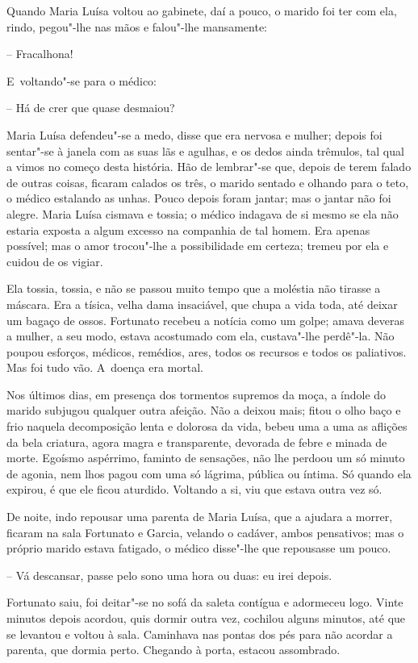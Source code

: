 Quando Maria Luísa voltou ao gabinete, daí a pouco, o marido foi ter com
ela, rindo, pegou"-lhe nas mãos e falou"-lhe mansamente:

-- Fracalhona!

E~voltando"-se para o médico:

-- Há de crer que quase desmaiou?

Maria Luísa defendeu"-se a medo, disse que era nervosa e mulher; depois
foi sentar"-se à janela com as suas lãs e agulhas, e os dedos ainda
trêmulos, tal qual a vimos no começo desta história. Hão de lembrar"-se
que, depois de terem falado de outras coisas, ficaram calados os três, o
marido sentado e olhando para o teto, o médico estalando as unhas. Pouco
depois foram jantar; mas o jantar não foi alegre. Maria Luísa cismava e
tossia; o médico indagava de si mesmo se ela não estaria exposta a algum
excesso na companhia de tal homem. Era apenas possível; mas o amor
trocou"-lhe a possibilidade em certeza; tremeu por ela e cuidou de os
vigiar.

Ela tossia, tossia, e não se passou muito tempo que a moléstia não
tirasse a máscara. Era a tísica, velha dama insaciável, que chupa a vida
toda, até deixar um bagaço de ossos. Fortunato recebeu a notícia como um
golpe; amava deveras a mulher, a seu modo, estava acostumado com ela,
custava"-lhe perdê"-la. Não poupou esforços, médicos, remédios, ares,
todos os recursos e todos os paliativos. Mas foi tudo vão. A~doença era
mortal.

Nos últimos dias, em presença dos tormentos supremos da moça, a índole
do marido subjugou qualquer outra afeição. Não a deixou mais; fitou o
olho baço e frio naquela decomposição lenta e dolorosa da vida, bebeu
uma a uma as aflições da bela criatura, agora magra e transparente,
devorada de febre e minada de morte. Egoísmo aspérrimo, faminto de
sensações, não lhe perdoou um só minuto de agonia, nem lhos pagou com
uma só lágrima, pública ou íntima. Só quando ela expirou, é que ele
ficou aturdido. Voltando a si, viu que estava outra vez só.

De noite, indo repousar uma parenta de Maria Luísa, que a ajudara a
morrer, ficaram na sala Fortunato e Garcia, velando o cadáver, ambos
pensativos; mas o próprio marido estava fatigado, o médico disse"-lhe que
repousasse um pouco.

-- Vá descansar, passe pelo sono uma hora ou duas: eu irei depois.

Fortunato saiu, foi deitar"-se no sofá da saleta contígua e adormeceu
logo. Vinte minutos depois acordou, quis dormir outra vez, cochilou
alguns minutos, até que se levantou e voltou à sala. Caminhava nas
pontas dos pés para não acordar a parenta, que dormia perto. Chegando à
porta, estacou assombrado.

